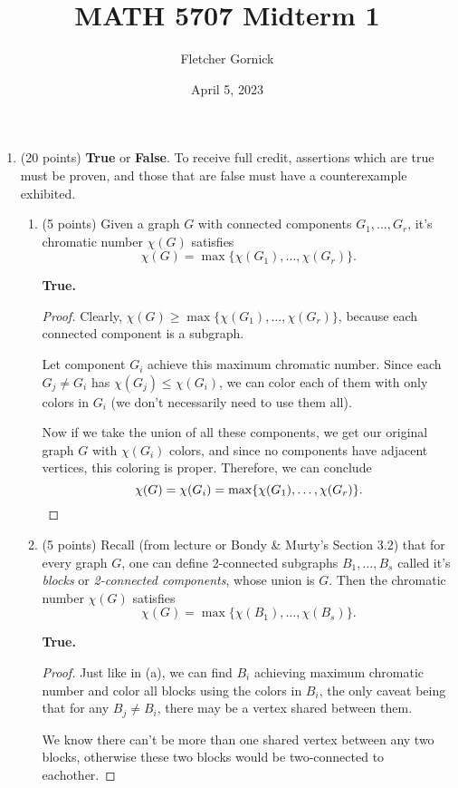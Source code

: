 \documentclass[11pt]{article}
\title{\vspace{-1.0cm}MATH 5707 Midterm 1}
\author{Fletcher Gornick}
\date{April 5, 2023}
\newcommand{\n}{\vspace{0.3cm}}
\begin{document}
\maketitle
  \begin{enumerate}
    \item (20 points) \textbf{True} or \textbf{False}.  To receive full credit, assertions which are true must be proven, and those that are false must have a counterexample exhibited.
      \begin{enumerate}[label=(\alph*)]
        \item (5 points) Given a graph \(G\) with connected components \(G_1, \hdots, G_r\), it's chromatic number \(\chi(G)\) satisfies 
          \[\chi(G) = \max \{\chi(G_1), \hdots, \chi(G_r)\}.\]

          \textbf{True.}
          \begin{proof}
            Clearly, \(\chi(G) \geq \max \{\chi(G_1), \hdots, \chi(G_r)\}\), because each connected component is a subgraph. \n

            Let component \(G_i\) achieve this maximum chromatic number.  Since each \(G_j \neq G_i\) has \(\chi(G_j) \leq \chi(G_i)\), we can color each of them with only colors in \(G_i\) (we don't necessarily need to use them all). \n

            Now if we take the union of all these components, we get our original graph \(G\) with \(\chi(G_i)\) colors, and since no components have adjacent vertices, this coloring is proper.  Therefore, we can conclude 
            \[\chi(G) = \chi(G_i) = \max \{\chi(G_1), \hdots, \chi(G_r)\}. \qedhere\]
          \end{proof} \n
          

        \item (5 points) Recall (from lecture or Bondy \& Murty’s Section 3.2) that for every graph \(G\), one can define 2-connected subgraphs \(B_1, \hdots, B_s\) called it's \textit{blocks} or \textit{2-connected components}, whose union is \(G\).  Then the chromatic number \(\chi(G)\) satisfies
          \[\chi(G) = \max \{\chi(B_1), \hdots, \chi(B_s)\}.\]

          \textbf{True.}
          \begin{proof}
            Just like in (a), we can find \(B_i\) achieving maximum chromatic number and color all blocks using the colors in \(B_i\), the only caveat being that for any \(B_j \neq B_i\), there may be a vertex shared between them. \n

            We know there can't be more than one shared vertex between any two blocks, otherwise these two blocks would be two-connected to eachother. \n


\end{proof}
\end{enumerate}
\end{enumerate}
\end{document}
